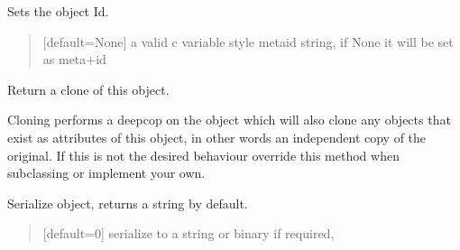 \documentclass[letterpaper,12pt,english]{sphinxmanual}
\begin{document}
\begin{fulllineitems}
\begin{fulllineitems}
\begin{quote}
\begin{description}
\end{description}\end{quote}

\end{fulllineitems}


\begin{fulllineitems}
\label{\detokenize{api/core:cbmpy.CBModel.Fbase.setMetaId}}
\pysigstartsignatures
\pysiglinewithargsret
{}
{}
{}
\pysigstopsignatures
\sphinxAtStartPar
Sets the object Id.
\begin{quote}\begin{description}
\sphinxAtStartPar
{} \textendash{} {[}default=None{]} a valid c variable style metaid string, if None it will be set as meta+id

\end{description}\end{quote}

\end{fulllineitems}


\begin{fulllineitems}
\label{\detokenize{api/core:cbmpy.CBModel.Fbase.clone}}
\pysigstartsignatures
\pysiglinewithargsret
{}
{}
{}
\pysigstopsignatures
\sphinxAtStartPar
Return a clone of this object.

\sphinxAtStartPar
Cloning performs a deepcop on the object which will also clone any objects that
exist as attributes of this object, in other words an independent copy of the
original. If this is not the desired behaviour override this method when
subclassing or implement your own.

\end{fulllineitems}


\begin{fulllineitems}
\label{\detokenize{api/core:cbmpy.CBModel.Fbase.serialize}}
\pysigstartsignatures
\pysiglinewithargsret
{}
{}
{}
\pysigstopsignatures
\sphinxAtStartPar
Serialize object, returns a string by default.
\begin{quote}\begin{description}
\sphinxAtStartPar
{} \textendash{} {[}default=0{]} serialize to a string or binary if required,


\end{description}
\end{quote}
\end{fulllineitems}
\end{fulllineitems}
\end{document}
